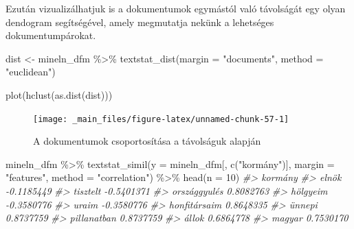 \documentclass[
]{book}
\newenvironment{Shaded}{\begin{snugshade}}{\end{snugshade}}
\newcommand{\AttributeTok}[1]{\textcolor[rgb]{0.77,0.63,0.00}{#1}}
\newcommand{\CommentTok}[1]{\textcolor[rgb]{0.56,0.35,0.01}{\textit{#1}}}
\newcommand{\DecValTok}[1]{\textcolor[rgb]{0.00,0.00,0.81}{#1}}
\newcommand{\FunctionTok}[1]{\textcolor[rgb]{0.00,0.00,0.00}{#1}}
\newcommand{\NormalTok}[1]{#1}
\newcommand{\OtherTok}[1]{\textcolor[rgb]{0.56,0.35,0.01}{#1}}
\newcommand{\SpecialCharTok}[1]{\textcolor[rgb]{0.00,0.00,0.00}{#1}}
\newcommand{\StringTok}[1]{\textcolor[rgb]{0.31,0.60,0.02}{#1}}
\begin{document}
Ezután vizualizálhatjuk is a dokumentumok egymástól való távolságát egy
olyan dendogram segítségével, amely megmutatja nekünk a lehetséges
dokumentumpárokat.

\begin{Shaded}
\begin{Highlighting}[]
\NormalTok{dist }\OtherTok{\textless{}{-}}\NormalTok{ mineln\_dfm }\SpecialCharTok{\%\textgreater{}\%}
  \FunctionTok{textstat\_dist}\NormalTok{(}\AttributeTok{margin =} \StringTok{"documents"}\NormalTok{, }\AttributeTok{method =} \StringTok{"euclidean"}\NormalTok{)}
\end{Highlighting}
\end{Shaded}

\begin{Shaded}
\begin{Highlighting}[]
\FunctionTok{plot}\NormalTok{(}\FunctionTok{hclust}\NormalTok{(}\FunctionTok{as.dist}\NormalTok{(dist)))}
\end{Highlighting}
\end{Shaded}

\begin{figure}

{\centering \texttt{[image: \_main\_files/figure-latex/unnamed-chunk-57-1]} 

}

\caption{A dokumentumok csoportosítása a távolságuk alapján}\label{fig:unnamed-chunk-57}
\end{figure}

\begin{Shaded}
\begin{Highlighting}[]
\NormalTok{mineln\_dfm }\SpecialCharTok{\%\textgreater{}\%}
  \FunctionTok{textstat\_simil}\NormalTok{(}\AttributeTok{y =}\NormalTok{ mineln\_dfm[, }\FunctionTok{c}\NormalTok{(}\StringTok{"kormány"}\NormalTok{)], }\AttributeTok{margin =} \StringTok{"features"}\NormalTok{, }\AttributeTok{method =} \StringTok{"correlation"}\NormalTok{) }\SpecialCharTok{\%\textgreater{}\%}
  \FunctionTok{head}\NormalTok{(}\AttributeTok{n =} \DecValTok{10}\NormalTok{)}
\CommentTok{\#\textgreater{}                 kormány}
\CommentTok{\#\textgreater{} elnök        {-}0.1185449}
\CommentTok{\#\textgreater{} tisztelt     {-}0.5401371}
\CommentTok{\#\textgreater{} országgyulés  0.8082763}
\CommentTok{\#\textgreater{} hölgyeim     {-}0.3580776}
\CommentTok{\#\textgreater{} uraim        {-}0.3580776}
\CommentTok{\#\textgreater{} honfitársaim  0.8648335}
\CommentTok{\#\textgreater{} ünnepi        0.8737759}
\CommentTok{\#\textgreater{} pillanatban   0.8737759}
\CommentTok{\#\textgreater{} állok         0.6864778}
\CommentTok{\#\textgreater{} magyar        0.7530170}
\end{Highlighting}
\end{Shaded}
\end{document}
